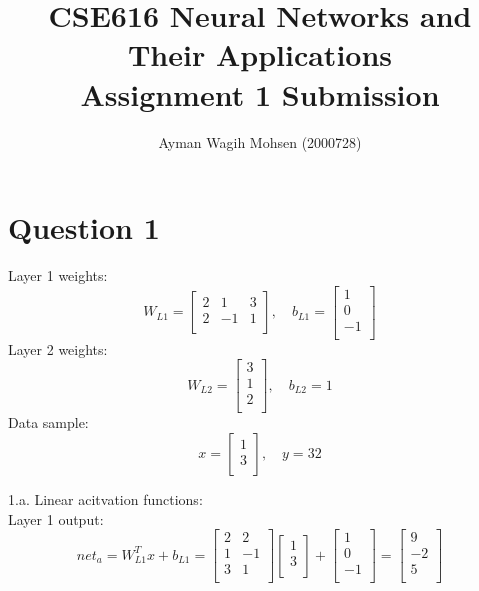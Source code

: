 \documentclass[10pt]{article}
\begin{document}
\title{CSE616 Neural Networks and Their Applications\\
Assignment 1 Submission}
\author{Ayman Wagih Mohsen (2000728)}
\maketitle

\section{Question 1}

Layer 1 weights:
\[
	W_{L1}=
	\left[
	{
		\begin{array}{ccc}
		2&1&3\\
		2&-1&1\\
		\end{array}
	}
	\right],\quad
	b_{L1}=
	\left[
	{
		\begin{array}{c}
		1\\
		0\\
		-1\\
		\end{array}
	}
	\right]
\]
Layer 2 weights:
\[
	W_{L2}=
	\left[
	{
		\begin{array}{c}
		3\\
		1\\
		2\\
		\end{array}
	}
	\right],\quad
	b_{L2}=1
\]
Data sample:
\[
	x=
	\left[
	{
		\begin{array}{c}
		1\\
		3\\
		\end{array}
	}
	\right],\quad
	y=32
\]

1.a. Linear acitvation functions:\\
Layer 1 output:
\[
	net_{a}=W_{L1}^T x + b_{L1}=
	\left[
	{
		\begin{array}{cc}
		2&2\\
		1&-1\\
		3&1\\
		\end{array}
	}
	\right]
	\left[
	{
		\begin{array}{c}
		1\\
		3\\
		\end{array}
	}
	\right]+
	\left[
	{
		\begin{array}{c}
		1\\
		0\\
		-1\\
		\end{array}
	}
	\right]=
	\left[
	{
		\begin{array}{c}
		9\\
		-2\\
		5\\
		\end{array}
	}
	\right]
\]
\end{document}
